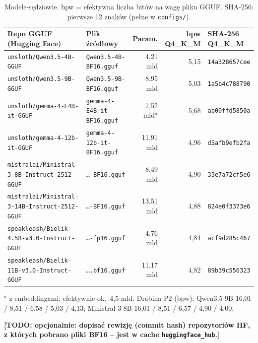 \documentclass[10pt,a4paper]{article}
\newcommand{\TODO}[1]{{\color{red!75!black}\textbf{[TODO: #1]}}}
\begin{document}
\begin{table}[!htbp]
\centering\footnotesize\setlength{\tabcolsep}{3pt}
\caption{Modele-sędziowie. bpw = efektywna liczba bitów na wagę pliku GGUF. SHA-256: pierwsze 12 znaków (pełne w \texttt{configs/}).}
\label{tab:models}
\begin{tabular}{@{}l l r r l@{}}
\toprule
Repo GGUF (Hugging Face) & Plik źródłowy & Param. & bpw Q4\_K\_M & SHA-256 Q4\_K\_M \\
\midrule
\texttt{unsloth/Qwen3.5-4B-GGUF}  & \texttt{Qwen3.5-4B-BF16.gguf} & 4,21 mld & 5,15 & \texttt{14a328657cee} \\
\texttt{unsloth/Qwen3.5-9B-GGUF}  & \texttt{Qwen3.5-9B-BF16.gguf} & 8,95 mld & 5,03 & \texttt{1a5b4c788790} \\
\texttt{unsloth/gemma-4-E4B-it-GGUF} & \texttt{gemma-4-E4B-it-BF16.gguf} & 7,52 mld$^{a}$ & 5,68 & \texttt{ab00ffd5850a} \\
\texttt{unsloth/gemma-4-12b-it-GGUF} & \texttt{gemma-4-12b-it-BF16.gguf} & 11,91 mld & 4,96 & \texttt{d5afb9efb2fa} \\
\texttt{mistralai/Ministral-3-8B-Instruct-2512-GGUF} & \texttt{…-BF16.gguf} & 8,49 mld & 4,90 & \texttt{33e7a72cf5e6} \\
\texttt{mistralai/Ministral-3-14B-Instruct-2512-GGUF} & \texttt{…-BF16.gguf} & 13,51 mld & 4,88 & \texttt{824e0f3373e6} \\
\texttt{speakleash/Bielik-4.5B-v3.0-Instruct-GGUF} & \texttt{…-fp16.gguf} & 4,76 mld & 4,84 & \texttt{acf9d285c467} \\
\texttt{speakleash/Bielik-11B-v3.0-Instruct-GGUF} & \texttt{….bf16.gguf} & 11,17 mld & 4,82 & \texttt{89b39c556323} \\
\bottomrule
\end{tabular}

\smallskip
{\footnotesize $^{a}$ z embeddingami; efektywnie ok.~4,5 mld. Drabina P2 (bpw): Qwen3.5-9B 16,01 / 8,51 / 6,58 / 5,03 / 4,13; Ministral-3-8B 16,01 / 8,51 / 6,57 / 4,90 / 4,00.}
\end{table}

\TODO{opcjonalnie: dopisać rewizję (commit hash) repozytoriów HF, z których pobrano pliki BF16 -- jest w cache \texttt{huggingface\_hub}.}
\end{document}
